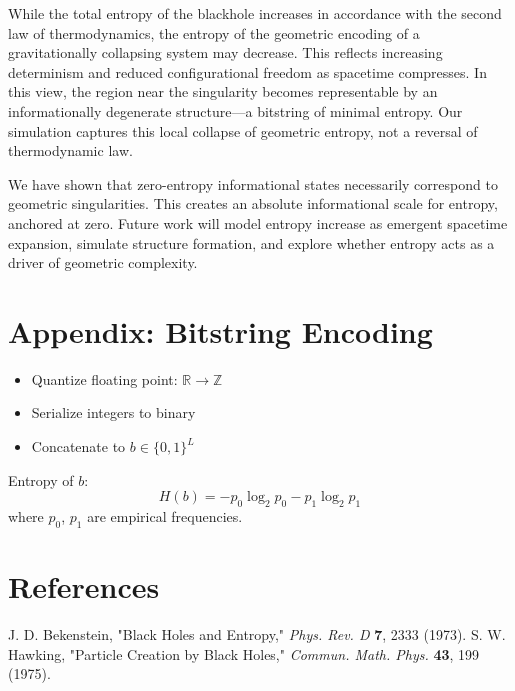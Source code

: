 \documentclass[11pt]{article}
\begin{document}
While the total entropy of the blackhole increases in accordance with the second law of thermodynamics, the entropy of the geometric encoding of a gravitationally collapsing system may decrease. This reflects increasing determinism and reduced configurational freedom as spacetime compresses. In this view, the region near the singularity becomes representable by an informationally degenerate structure—a bitstring of minimal entropy. Our simulation captures this local collapse of geometric entropy, not a reversal of thermodynamic law.

We have shown that zero-entropy informational states necessarily correspond to geometric singularities. This creates an absolute informational scale for entropy, anchored at zero. Future work will model entropy increase as emergent spacetime expansion, simulate structure formation, and explore whether entropy acts as a driver of geometric complexity.

\appendix
\section{Appendix: Bitstring Encoding}

\begin{itemize}
  \item Quantize floating point: $\mathbb{R} \to \mathbb{Z}$
  \item Serialize integers to binary
  \item Concatenate to $b \in \{0,1\}^L$
\end{itemize}

Entropy of $b$:
\[
  H(b) = -p_0 \log_2 p_0 - p_1 \log_2 p_1
\]
where $p_0$, $p_1$ are empirical frequencies.

\section*{References}
\begin{thebibliography}{9}
   J. D. Bekenstein, "Black Holes and Entropy," \textit{Phys. Rev. D} \textbf{7}, 2333 (1973).
   S. W. Hawking, "Particle Creation by Black Holes," \textit{Commun. Math. Phys.} \textbf{43}, 199 (1975).
\end{thebibliography}
\end{document}

